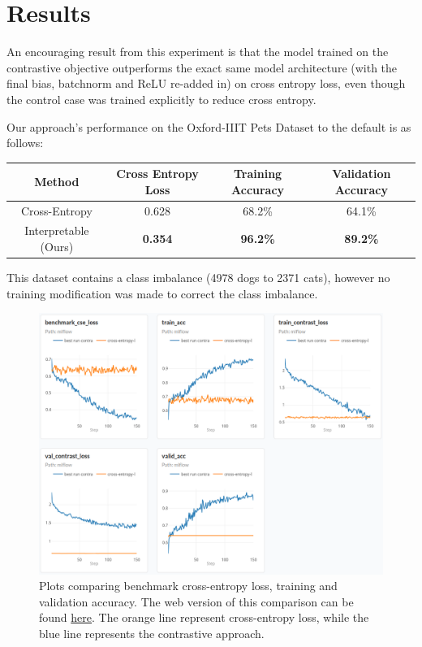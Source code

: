 \documentclass{article}
\begin{document}
\section{Results}

An encouraging result from this experiment is that the model trained on the contrastive objective outperforms the exact same model architecture (with the final bias, batchnorm and ReLU re-added in) on cross entropy loss, even though the control case was trained explicitly to reduce cross entropy.

Our approach's performance on the Oxford-IIIT Pets Dataset to the default is as follows:

\begin{table}[h]
	\centering
	\begin{tabular}{c|ccc}
		\toprule
		\textbf{Method}  & \textbf{Cross Entropy Loss}  & \textbf{Training Accuracy}   & \textbf{Validation Accuracy} \\
		\midrule
		Cross-Entropy & 0.628 & 68.2\% & 64.1\% \\
		Interpretable (Ours) & \bf 0.354 & \bf 96.2\% & \bf 89.2\% \\
		\bottomrule
	\end{tabular}
\end{table}

This dataset contains a class imbalance (4978 dogs to 2371 cats), however no training modification was made to correct the class imbalance.

\begin{figure}[H]
	\centering
	\includegraphics[width=.8\textwidth]{img/plots.png}
	\caption{Plots comparing benchmark cross-entropy loss, training and validation accuracy. The web version of this comparison can be found \href{https://dagshub.com/jinensetpal/contrastive-optimization/experiments\#/compare?experiments=[\%22m_dd3fe52afeca42539f87d5da6ac4ea3f\%22,\%22m_e21074d967b741dfb772746b113fe761\%22]}{here}. The orange line represent cross-entropy loss, while the blue line represents the contrastive approach.}
\end{figure}
\end{document}

